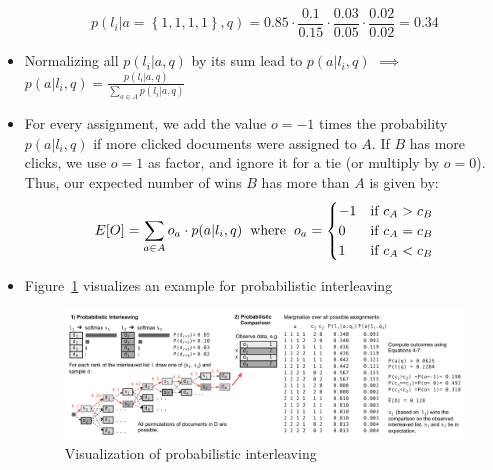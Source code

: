 \begin{itemize}
	$$p(l_i|a=\left\{1,1,1,1\right\},q) = 0.85 \cdot \frac{0.1}{0.15} \cdot \frac{0.03}{0.05} \cdot \frac{0.02}{0.02} = 0.34$$
	\item Normalizing all $p(l_i|a,q)$ by its sum lead to $p(a|l_i,q)$ $\implies$ $p(a|l_i,q) = \frac{p(l_i|a,q)}{\sum_{a \in A} p(l_i|a,q)}$
	\item For every assignment, we add the value $o=-1$ times the probability $p(a|l_i,q)$ if more clicked documents were assigned to $A$. If $B$ has more clicks, we use $o=1$ as factor, and ignore it for a tie (or multiply by $o=0$). Thus, our expected number of wins $B$ has more than $A$ is given by:
	$$E[O] = \sum_{a \in A} o_a \cdot p(a|l_i,q) \text{\hspace{2mm}where\hspace{2mm}} o_a = \begin{cases}
	 -1 & \text{if } c_A > c_B\\
	 0 & \text{if } c_A = c_B\\
	 1 & \text{if } c_A < c_B
	\end{cases}$$
	\item Figure~\ref{img:online_eval_probabilistic_interleaving_2} visualizes an example for probabilistic interleaving
	\begin{figure}[ht]
		\centering
		\includegraphics[width=\textwidth]{figures/online_eval_probabilistic_interleaving_2.png}
		\caption{Visualization of probabilistic interleaving}
		\label{img:online_eval_probabilistic_interleaving_2}
	\end{figure}
\end{itemize}